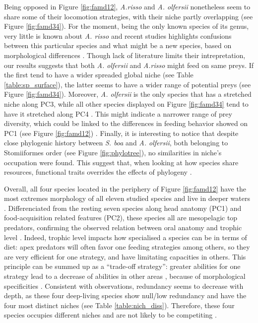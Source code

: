 Being opposed in Figure \ref{fig:famd12}, \textit{A.risso} and \textit{A. olfersii} nonetheless seem to share some of their locomotion strategies, with their niche partly overlapping (see Figure \ref{fig:famd34}). For the moment, being the only known species of its genus, very little is known about \textit{A. risso} and recent studies highlights confusions between this particular species and what might be a new species, based on morphological differences \citep{ho2019}. Though lack of literature limits their intrepretation, our results suggests that both \textit{A. olfersii} and \textit{A.risso} might feed on same preys. If the first tend to have a wider spreaded global niche (see Table \ref{table:sp_surface}), the latter seems to have a wider range of potential preys (see Figure \ref{fig:famd34}). Moreover, \textit{A. olfersii} is the only species that has a stretched niche along PC3, while all other species displayed on Figure \ref{fig:famd34} tend to have it stretched along PC4 . This might indicate a narrower range of prey diversity, which could be linked to the differences in feeding behavior showed on PC1 (see Figure \ref{fig:famd12}) . Finally, it is interesting to notice that despite close phylogenic history between \textit{S. boa} and \textit{A. olfersii}, both belonging to Stomiiformes order (see Figure \ref{fig:phylotree}), no similarities in niche's occupation were found. This suggest that, when looking at how species share resources, functional traits overrides the effects of phylogeny \citep{kremer2017}. 

Overall, all four species located in the periphery of Figure \ref{fig:famd12} have the most extremes morphology of all eleven studied species and live in deeper waters \citep{froese2019}. Differenciated from the resting seven species along head anatomy (PC1) and food-acquisition related features (PC2), these species all are mesopelagic top predators, confirming the observed relation between oral anatomy and trophic level \citep{colborne2013,wainwright1995}. Indeed, trophic level impacts how specialised a species can be in terms of diet: apex predators will often favor one feeding strategies among others, so they are very efficient for one strategy, and have limitating capacities in others. This principle can be summed up as a ``trade-off strategy'': greater abilities for one strategy lead to a decrease of abilities in other areas \citet{norton1995}, because of morphological specificities \citep{nagelkerke2018}. Consistent with \citet{farre2016} observations, redundancy seems to decrease with depth, as these four deep-living species show null/low redundancy and have the four most distinct niches (see Table \ref{table:nich_diss}). Therefore, these four species occupies different niches and are not likely to be competiting \citep{mouillot2005}. 

